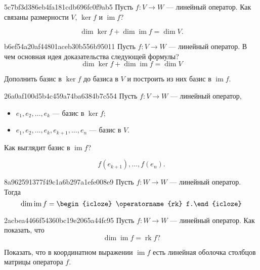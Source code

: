\begin{note}{5c7bf3d386eb4fa181cdb696fc0f9ab5}
    Пусть \( f : V \to W \) --- линейный оператор. Как связаны размерности \( V \), \( \ker f \) и \( \operatorname{im} f \)?

    \begin{cloze}{1}
        \[
            \dim \ker f + \dim \operatorname{im} f = \dim V.
        \]
    \end{cloze}
\end{note}

\begin{note}{b6ef54a20af44801aceb30b556b95011}
    Пусть \( f : V \to W \) --- линейный оператор. В чем основная идея доказательства следующей формулы?
    \[
        \dim \ker f + \dim \operatorname{im} f = \dim V
    \]

    \begin{cloze}{1}
        Дополнить базис в \( \ker f \) до базиса в \( V \) и построить из них базис в \( \operatorname{im} f \).
    \end{cloze}
\end{note}

\begin{note}{26a0af100d5b4c459a74ba6384b7c554}
    Пусть \( f : V \to W \) --- линейный оператор,
    \begin{itemize}
        \item \( e_1,e_2, \ldots, e_k  \) --- базис в \( \ker f \);
        \item \( e_1,e_2, \ldots, e_k, e_{k+1}, \ldots, e_n  \) --- базис в \( V \).
    \end{itemize}
    Как выглядит базис в \( \operatorname{im} f \)?

    \begin{cloze}{1}
        \[
            f(e_{k+1}), \ldots, f(e_n).
        \]
    \end{cloze}
\end{note}

\begin{note}{8a962591377f49c1a6b297a1efe008e9}
    Пусть \( f : W \to W \) --- линейный оператор. Тогда
    \[
        \dim \operatorname{im} f = \begin{icloze}{1}\operatorname{rk} f.\end{icloze}
    \]
\end{note}

\begin{note}{2acbea4466f54360bc19e2065a44fc95}
    Пусть \( f : W \to W \) --- линейный оператор. Как показать, что
    \[
        \dim \operatorname{im} f = \operatorname{rk} f?
    \]

    \begin{cloze}{1}
        Показать, что в координатном выражении \( \operatorname{im} f \) есть линейная оболочка столбцов матрицы оператора \( f \).
    \end{cloze}
\end{note}

